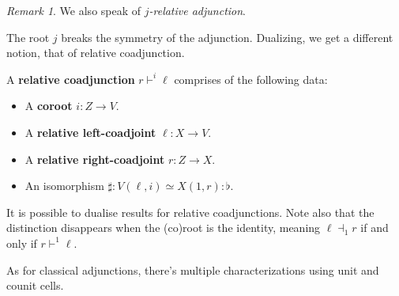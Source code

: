 \documentclass[10pt,a4paper]{article}
\theoremstyle{plain}
\theoremstyle{definition}
\theoremstyle{remark}
\newtheorem{remark}[theorem]{Remark}
\begin{document}
\begin{remark}
    We also speak of \textit{$j$-relative adjunction}.
\end{remark}

The root $j$ breaks the symmetry of the adjunction. Dualizing, we get a different notion, that of relative coadjunction.

\begin{definition}
    \begin{figure}
        \centering
    \end{figure}
    A \textbf{relative coadjunction} $r \vdash^i \ell$ comprises of the following data:
    \begin{itemize}
        \item A \textbf{coroot} $i : Z \to V$.
        \item A \textbf{relative left-coadjoint} $\ell : X \to V$.
        \item A \textbf{relative right-coadjoint} $r : Z \to X$.
        \item An isomorphism $\sharp : V(\ell, i) \simeq X(1, r) : \flat$.
    \end{itemize}
\end{definition}

It is possible to dualise results for relative coadjunctions. Note also that the distinction disappears when the (co)root is the identity, meaning $\ell\dashv_1 r$ if and only if $r\vdash^1\ell$.

As for classical adjunctions, there's multiple characterizations using unit and counit cells.
\end{document}
